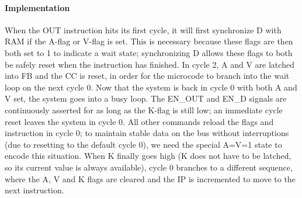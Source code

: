 \paragraph{Implementation}
When the OUT instruction hits its first cycle, it will first synchronize D with RAM if the A-flag or V-flag is set. This is necessary because these flags are then both set to 1 to indicate a wait state; synchronizing D allows these flags to both be safely reset when the instruction has finished. In cycle 2, A and V are latched into FB and the CC is reset, in order for the microcode to branch into the wait loop on the next cycle 0. Now that the system is back in cycle 0 with both A and V set, the system goes into a busy loop. The EN\_OUT and EN\_D signals are continuously asserted for as long as the K-flag is still low; an immediate cycle reset leaves the system in cycle 0. All other commands reload the flags and instruction in cycle 0; to maintain stable data on the bus without interruptions (due to resetting to the default cycle 0), we need the special A=V=1 state to encode this situation. When K finally goes high (K does not have to be latched, so its current value is always available), cycle 0 branches to a different sequence, where the A, V and K flags are cleared and the IP is incremented to move to the next instruction.

